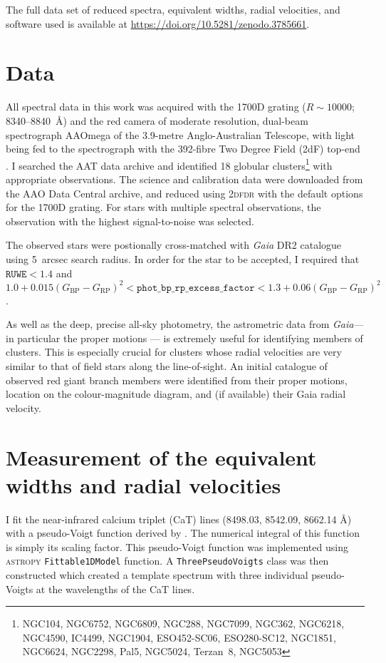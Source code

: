 \documentclass[RNAAS]{aastex63}
\newcommand{\bprp}{\ensuremath{G_\textrm{BP}-G_\textrm{RP}}}
\newcommand{\gaia}{\textit{Gaia}\xspace}
\begin{document}
The full data set of reduced spectra, equivalent widths, radial velocities, and software used is available at \url{https://doi.org/10.5281/zenodo.3785661}.


\section{Data}
All spectral data in this work was acquired with the 1700D grating ($R\sim10000$; 8340--8840~\AA) and the red camera of moderate resolution, dual-beam spectrograph AAOmega \citep{Sharp2006} of the 3.9-metre Anglo-Australian Telescope, with light being fed to the spectrograph with the 392-fibre Two Degree Field (2dF) top-end \citep{Lewis2002}. I searched the AAT data archive and identified 18 globular clusters\footnote{NGC104, NGC6752, NGC6809, NGC288, NGC7099, NGC362, NGC6218, NGC4590, IC4499, NGC1904, ESO452-SC06, ESO280-SC12, NGC1851, NGC6624, NGC2298, Pal5, NGC5024, Terzan~8, NGC5053} with appropriate observations. The science and calibration data were downloaded from the AAO Data Central archive, and reduced using \textsc{2dfdr} \citep{AAOSoftwareTeam2015} with the default options for the 1700D grating. For stars with multiple spectral observations, the observation with the highest signal-to-noise was selected.

The observed stars were postionally cross-matched with \gaia DR2 catalogue \citep{GaiaCollaboration2016,GaiaCollaboration2018a} using 5~arcsec search radius. In order for the star to be accepted, I required that $\texttt{RUWE}<1.4$ \citep{Lindegren2018a} and $1.0+0.015(\bprp)^2 < \mathrm{\texttt{phot\_bp\_rp\_excess\_factor}} <1.3+0.06(\bprp)^2$ \citep{Evans2018a}.

As well as the deep, precise all-sky photometry, the astrometric data from \gaia --- in particular the proper motions --- is extremely useful for identifying members of clusters. This is especially crucial for clusters whose radial velocities are very similar to that of field stars along the line-of-sight. An initial catalogue of observed red giant branch members were identified from their proper motions, location on the colour-magnitude diagram, and (if available) their Gaia radial velocity. 

\section{Measurement of the equivalent widths and radial velocities}
I fit the near-infrared calcium triplet (CaT) lines (8498.03, 8542.09, 8662.14 \AA) with a pseudo-Voigt function derived by \citet{Thompson1987}. The numerical integral of this function is simply its scaling factor.
This pseudo-Voigt function was implemented using \textsc{astropy} \texttt{Fittable1DModel} function. A \texttt{ThreePseudoVoigts} class was then constructed which created a template spectrum with three individual pseudo-Voigts at the wavelengths of the CaT lines.
\end{document}
